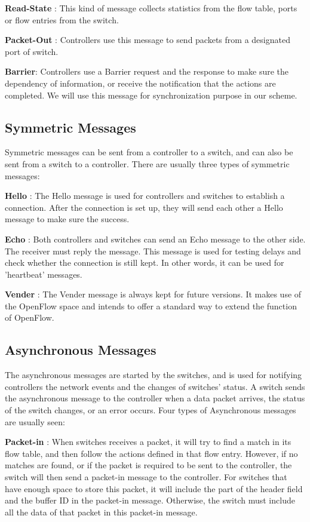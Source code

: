 \textbf{Read-State} : This kind of message collects statistics from the flow table, ports or flow entries from the switch.

\textbf{Packet-Out} : Controllers use this message to send packets from a designated port of switch.

\textbf{Barrier}: Controllers use a Barrier request and the response to make sure the dependency of information, or receive the notification that the actions are completed. We will use this message for synchronization purpose in our scheme.

\subsection{Symmetric Messages}
\label{sec:Symmetric Messages}

Symmetric messages can be sent from a controller to a switch, and can also be sent from a switch to a controller. There are usually three types of symmetric messages:

\textbf{Hello} : The Hello message is used for controllers and switches to establish a connection. After the connection is set up, they will send each other a Hello message to make sure the success.

\textbf{Echo} : Both controllers and switches can send an Echo message to the other side. The receiver must reply the message. This message is used for testing delays and check whether the connection is still kept. In other words, it can be used for 'heartbeat' messages.

\textbf{Vender} : The Vender message is always kept for future versions. It makes use of the OpenFlow space and intends to offer a standard way to extend the function of OpenFlow.

\subsection{Asynchronous Messages}
\label{sec:Asynchronous Messages}

The asynchronous messages are started by the switches, and is used for notifying controllers the network events and the changes of switches' status. A switch sends the asynchronous message to the controller when a data packet arrives, the status of the switch changes, or an error occurs. Four types of Asynchronous messages are usually seen:

\textbf{Packet-in} : When switches receives a packet, it will try to find a match in its flow table, and then follow the actions defined in that flow entry. However, if no matches are found, or if the packet is required to be sent to the controller, the switch will then send a packet-in message to the controller. For switches that have enough space to store this packet, it will include the part of the header field and the buffer ID in the packet-in message. Otherwise, the switch must include all the data of that packet in this packet-in message.

